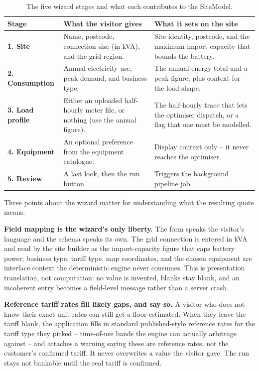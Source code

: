 \begin{table}[H]
\centering
\caption{The five wizard stages and what each contributes to the SiteModel.}
\label{tab:wizard}
\small\sffamily
\begin{tabularx}{\textwidth}{@{}l L L@{}}
\toprule
\textbf{Stage} & \textbf{What the visitor gives} & \textbf{What it sets on the site} \\
\midrule
\textbf{1. Site} & Name, postcode, connection size (in kVA), and the grid region. & Site identity, postcode, and the maximum import capacity that bounds the battery. \\
\textbf{2. Consumption} & Annual electricity use, peak demand, and business type. & The annual energy total and a peak figure, plus context for the load shape. \\
\textbf{3. Load profile} & Either an uploaded half-hourly meter file, or nothing (use the annual figure). & The half-hourly trace that lets the optimiser dispatch, or a flag that one must be modelled. \\
\textbf{4. Equipment} & An optional preference from the equipment catalogue. & Display context only -- it never reaches the optimiser. \\
\textbf{5. Review} & A last look, then the run button. & Triggers the background pipeline job. \\
\bottomrule
\end{tabularx}
\end{table}

Three points about the wizard matter for understanding what the resulting quote means.

\textbf{Field mapping is the wizard's only liberty.} The form speaks the visitor's language and the schema speaks its own. The grid connection is entered in kVA and read by the site builder as the import-capacity figure that caps battery power; business type, tariff type, map coordinates, and the chosen equipment are interface context the deterministic engine never consumes. This is presentation translation, not computation: no value is invented, blanks stay blank, and an incoherent entry becomes a field-level message rather than a server crash.

\textbf{Reference tariff rates fill likely gaps, and say so.} A visitor who does not know their exact unit rates can still get a floor estimated. When they leave the tariff blank, the application fills in standard published-style reference rates for the tariff type they picked -- time-of-use bands the engine can actually arbitrage against -- and attaches a warning saying these are reference rates, not the customer's confirmed tariff. It never overwrites a value the visitor gave. The run stays not bankable until the real tariff is confirmed.

